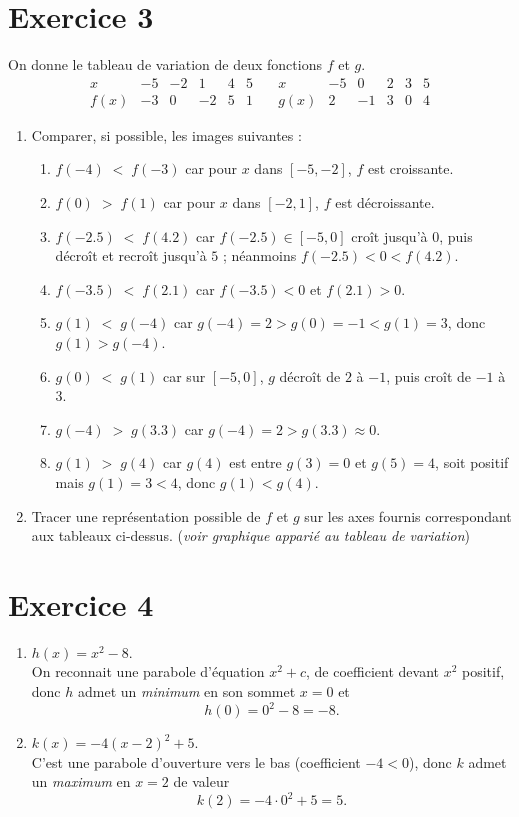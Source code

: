 \documentclass{article}
\theoremstyle{definition}
\begin{document}
\section*{Exercice 3}
On donne le tableau de variation de deux fonctions $f$ et $g$.
\[
\begin{array}{c|ccccc}
x      & -5 & -2 & 1 & 4 & 5 \\ \hline
f(x)   & -3 & 0  & -2 & 5 & 1
\end{array}
\quad
\begin{array}{c|ccccc}
x      & -5 & 0 & 2 & 3 & 5 \\ \hline
g(x)   & 2  & -1 & 3 & 0 & 4
\end{array}
\]
\begin{enumerate}[label=\arabic*.]
  \item Comparer, si possible, les images suivantes :
  \begin{enumerate}
    \item $f(-4)\;<\;f(-3)$ car pour $x$ dans $[-5,-2]$, $f$ est croissante.
    \item $f(0)\;>\;f(1)$ car pour $x$ dans $[-2,1]$, $f$ est décroissante.
    \item $f(-2.5)\;<\;f(4.2)$ car $f(-2.5)\in[-5,0]$ croît jusqu'à $0$, puis décroît et recroît jusqu'à $5$ ; néanmoins $f(-2.5)<0<f(4.2)$.
    \item $f(-3.5)\;<\;f(2.1)$ car $f(-3.5)<0$ et $f(2.1)>0$.
    \item $g(1)\;<\;g(-4)$ car $g(-4)=2>g(0)=-1<g(1)=3$, donc $g(1)>g(-4)$.
    \item $g(0)\;<\;g(1)$ car sur $[-5,0]$, $g$ décroît de $2$ à $-1$, puis croît de $-1$ à $3$.
    \item $g(-4)\;>\;g(3.3)$ car $g(-4)=2>g(3.3)\approx0$.
    \item $g(1)\;>\;g(4)$ car $g(4)$ est entre $g(3)=0$ et $g(5)=4$, soit positif mais $g(1)=3<4$, donc $g(1)<g(4)$.
  \end{enumerate}
  \item Tracer une représentation possible de $f$ et $g$ sur les axes fournis correspondant aux tableaux ci-dessus.  
        (\emph{voir graphique apparié au tableau de variation})
\end{enumerate}

\section*{Exercice 4}
\begin{enumerate}
  \item $h(x)=x^2-8$.\\
    On reconnait une parabole d'équation $x^2+c$, de coefficient devant $x^2$ positif, donc $h$ admet un \emph{minimum} en son sommet $x=0$ et
    \[
      h(0)=0^2-8=-8.
    \]
  \item $k(x)=-4(x-2)^2+5$.\\
    C'est une parabole d'ouverture vers le bas (coefficient $-4<0$), donc $k$ admet un \emph{maximum} en $x=2$ de valeur
    \[
      k(2)=-4\cdot0^2+5=5.
    \]
\end{enumerate}
\end{document}
